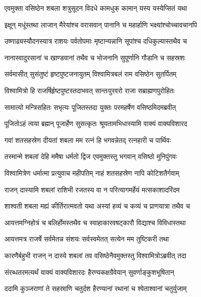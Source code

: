 
\twolineshloka
{एवमुक्ता वसिष्ठेन शबला शत्रुसूदन}
{विदधे कामधुक् कामान् यस्य यस्येप्सितं यथा} %

\twolineshloka
{इक्षून् मधूंस्तथा लाजान् मैरेयांश्च वरासवान्}
{पानानि च महार्हाणि भक्ष्यांश्चोच्चावचानपि} %

\twolineshloka
{उष्णाढ्यस्यौदनस्यात्र राशयः पर्वतोपमाः}
{मृष्टान्यन्नानि सूपांश्च दधिकुल्यास्तथैव च} %

\twolineshloka
{नानास्वादुरसानां च खाण्डवानां तथैव च}
{भोजनानि सुपूर्णानि गौडानि च सहस्रशः} %

\twolineshloka
{सर्वमासीत् सुसंतुष्टं हृष्टपुष्टजनायुतम्}
{विश्वामित्रबलं राम वसिष्ठेन सुतर्पितम्} %

\twolineshloka
{विश्वामित्रो हि राजर्षिर्हृष्टपुष्टस्तदाभवत्}
{सान्तःपुरवरो राजा सब्राह्मणपुरोहितः} %

\twolineshloka
{सामात्यो मन्त्रिसहितः सभृत्यः पूजितस्तदा}
{युक्तः परमहर्षेण वसिष्ठमिदमब्रवीत्} %

\twolineshloka
{पूजितोऽहं त्वया ब्रह्मन् पूजार्हेण सुसत्कृतः}
{श्रूयतामभिधास्यामि वाक्यं वाक्यविशारद} %

\twolineshloka
{गवां शतसहस्रेण दीयतां शबला मम}
{रत्नं हि भगवन्नेतद् रत्नहारी च पार्थिवः} %

\twolineshloka
{तस्मान्मे शबलां देहि ममैषा धर्मतो द्विज}
{एवमुक्तस्तु भगवान् वसिष्ठो मुनिपुंगवः} %

\twolineshloka
{विश्वामित्रेण धर्मात्मा प्रत्युवाच महीपतिम्}
{नाहं शतसहस्रेण नापि कोटिशतैर्गवाम्} %

\twolineshloka
{राजन् दास्यामि शबलां राशिभी रजतस्य वा}
{न परित्यागमर्हेयं मत्सकाशादरिंदम} %

\twolineshloka
{शाश्वती शबला मह्यं कीर्तिरात्मवतो यथा}
{अस्यां हव्यं च कव्यं च प्राणयात्रा तथैव च} %

\twolineshloka
{आयत्तमग्निहोत्रं च बलिर्होमस्तथैव च}
{स्वाहाकारवषट्कारौ विद्याश्च विविधास्तथा} %

\twolineshloka
{आयत्तमत्र राजर्षे सर्वमेतन्न संशयः}
{सर्वस्वमेतत् सत्येन मम तुष्टिकरी तथा} %

\twolineshloka
{कारणैर्बहुभी राजन् न दास्ये शबलां तव}
{वसिष्ठेनैवमुक्तस्तु विश्वामित्रोऽब्रवीत् तदा} %

\twolineshloka
{संरब्धतरमत्यर्थं वाक्यं वाक्यविशारदः}
{हैरण्यकक्षग्रैवेयान् सुवर्णाङ्कुशभूषितान्} %

\twolineshloka
{ददामि कुञ्जराणां ते सहस्राणि चतुर्दश}
{हैरण्यानां रथानां च श्वेताश्वानां चतुर्युजाम्} %

